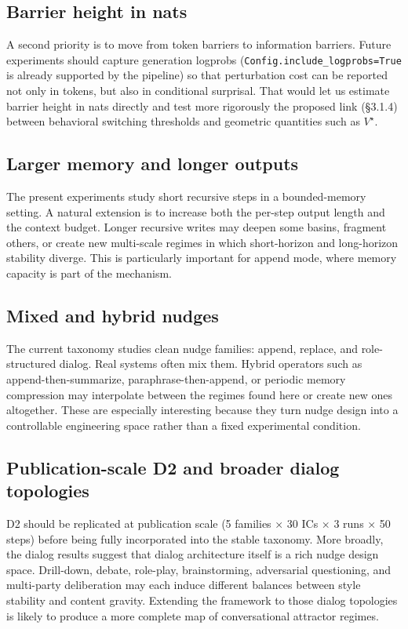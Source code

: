 \documentclass{article}
\theoremstyle{plain}
\theoremstyle{definition}
\begin{document}
\subsection{Barrier height in nats}

A second priority is to move from token barriers to information
barriers. Future experiments should capture generation logprobs
(\texttt{Config.include\_logprobs=True} is already supported by the pipeline)
so that perturbation cost can be reported not only in tokens, but
also in conditional surprisal. That would let us estimate barrier
height in nats directly and test more rigorously the proposed link
(§3.1.4) between behavioral switching thresholds and geometric
quantities such as $V^\star$.

\subsection{Larger memory and longer outputs}

The present experiments study short recursive steps in a
bounded-memory setting. A natural extension is to increase both the
per-step output length and the context budget. Longer recursive
writes may deepen some basins, fragment others, or create new
multi-scale regimes in which short-horizon and long-horizon
stability diverge. This is particularly important for append mode,
where memory capacity is part of the mechanism.

\subsection{Mixed and hybrid nudges}

The current taxonomy studies clean nudge families: append, replace,
and role-structured dialog. Real systems often mix them. Hybrid
operators such as append-then-summarize, paraphrase-then-append, or
periodic memory compression may interpolate between the regimes
found here or create new ones altogether. These are especially
interesting because they turn nudge design into a controllable
engineering space rather than a fixed experimental condition.

\subsection{Publication-scale D2 and broader dialog topologies}

D2 should be replicated at publication scale (5 families × 30 ICs ×
3 runs × 50 steps) before being fully incorporated into the stable
taxonomy. More broadly, the dialog results suggest that dialog
architecture itself is a rich nudge design space. Drill-down,
debate, role-play, brainstorming, adversarial questioning, and
multi-party deliberation may each induce different balances between
style stability and content gravity. Extending the framework to
those dialog topologies is likely to produce a more complete map of
conversational attractor regimes.
\end{document}
